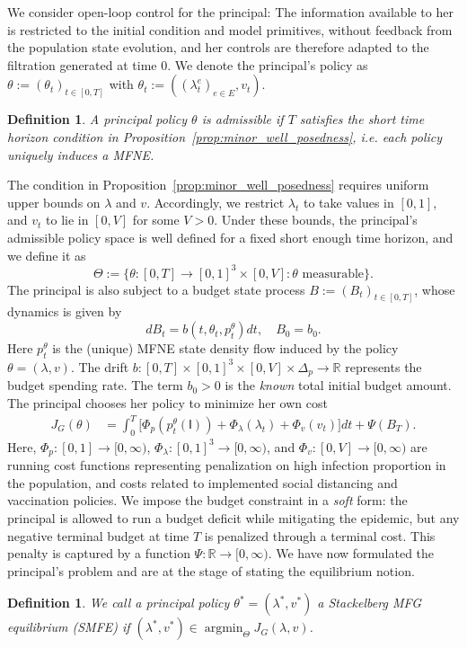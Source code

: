 \documentclass[letterpaper, 10 pt, conference]{ieeeconf}  %
\DeclareMathOperator*{\argmin}{argmin}
\def\sI{\mathsf{I}}
\newtheorem{definition}[theorem]{Definition}
\begin{document}
We consider open-loop control for the principal: The information available to her is restricted to the initial condition and model primitives, without feedback from the population state evolution, and her controls are therefore adapted to the filtration generated at time $0$. We denote the principal's policy as $\theta := (\theta_t)_{t \in [0,T]}$ with $\theta_t := ((\lambda_t^e)_{e \in E},v_t)$.
\begin{definition}
    A principal policy $\theta$ is \textit{admissible} if $T$ satisfies the short time horizon condition in Proposition~\ref{prop:minor_well_posedness}, i.e. each policy uniquely induces a MFNE.
\end{definition}
The condition in Proposition~\ref{prop:minor_well_posedness} requires uniform upper bounds on $\lambda$ and $v$. Accordingly, we restrict $\lambda_t$ to take values in $[0,1]$, and $v_t$ to lie in $[0,V]$ for some $V > 0$. 
Under these bounds, the principal's admissible policy space is well defined for a fixed short enough time horizon, and we define it as
$$\Theta:=\big\{\theta :[0, T] \rightarrow [0,1]^3 \times [0, V]: \theta \text { measurable} \big\}.$$
The principal is also subject to a budget state process $B := (B_t)_{t \in [0,T]}$, whose dynamics is given by
\begin{equation}
    \label{eq:budget_sde}
    dB_t = b(t,\theta_t,p_t^{\theta})dt, \quad B_0 = b_0.
\end{equation}
Here $p_t^{\theta}$ is the (unique) MFNE state density flow induced by the policy $\theta = (\lambda,v)$. The drift $b:[0,T] \times[0,1]^3 \times [0, V] \times \Delta_p \rightarrow \mathbb{R}$ represents the budget spending rate. The term $b_0 > 0$ is the \textit{known} total initial budget amount. The principal chooses her policy to minimize her own cost
{\small \begin{equation}
    \label{eq:principal_obj}
    \begin{aligned}
        J_{G}(\theta) & = \int_{0}^{T} \Big[\Phi_{p}(p_t^{\theta}(\sI)) + \Phi_{\lambda}(\lambda_t) + \Phi_{v}(v_t)\Big]dt + \Psi(B_T).
    \end{aligned}
\end{equation}}
Here, $\Phi_p:[0,1] \to [0,\infty)$, $\Phi_{\lambda}: [0,1]^3 \rightarrow [0,\infty)$, and $\Phi_{v}: [0,V] \rightarrow [0,\infty)$ are running cost functions representing penalization on high infection proportion in the population, and costs related to implemented social distancing and vaccination policies. We impose the budget constraint in a \textit{soft} form: the principal is allowed to run a budget deficit while mitigating the epidemic, but any negative terminal budget at time $T$ is penalized through a terminal cost. This penalty is captured by a function $\Psi: \mathbb{R} \rightarrow [0,\infty)$. We have now formulated the principal's problem and are at the stage of stating the equilibrium notion.
\begin{definition}
    \label{def:stackelberg_mfnash}
 We call a principal policy $\theta^* = (\lambda^*,v^*)$ a Stackelberg MFG equilibrium (SMFE) if $(\lambda^*,v^*) \in \argmin_{\Theta} J_{G}(\lambda,v)$.
\end{definition}
\end{document}
